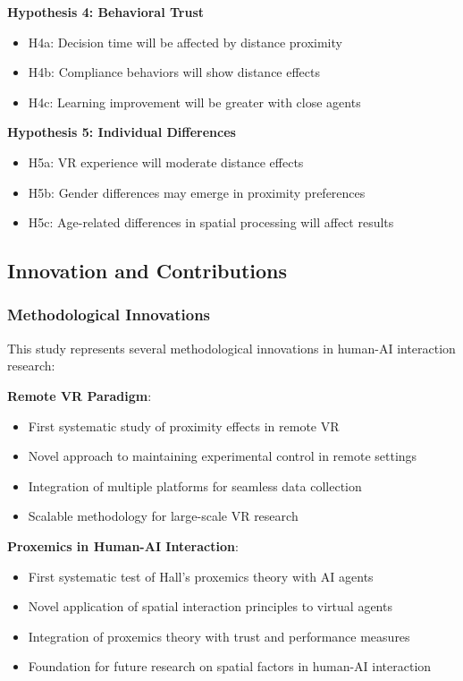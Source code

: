 \documentclass[12pt]{article}
\begin{document}
\textbf{Hypothesis 4: Behavioral Trust}
\begin{itemize}
    \item H4a: Decision time will be affected by distance proximity
    \item H4b: Compliance behaviors will show distance effects
    \item H4c: Learning improvement will be greater with close agents
\end{itemize}

\textbf{Hypothesis 5: Individual Differences}
\begin{itemize}
    \item H5a: VR experience will moderate distance effects
    \item H5b: Gender differences may emerge in proximity preferences
    \item H5c: Age-related differences in spatial processing will affect results
\end{itemize}

\subsection{Innovation and Contributions}

\subsubsection{Methodological Innovations}

This study represents several methodological innovations in human-AI interaction research:

\textbf{Remote VR Paradigm}:
\begin{itemize}
    \item First systematic study of proximity effects in remote VR
    \item Novel approach to maintaining experimental control in remote settings
    \item Integration of multiple platforms for seamless data collection
    \item Scalable methodology for large-scale VR research
\end{itemize}

\textbf{Proxemics in Human-AI Interaction}:
\begin{itemize}
    \item First systematic test of Hall's proxemics theory with AI agents
    \item Novel application of spatial interaction principles to virtual agents
    \item Integration of proxemics theory with trust and performance measures
    \item Foundation for future research on spatial factors in human-AI interaction
\end{itemize}
\end{document}
